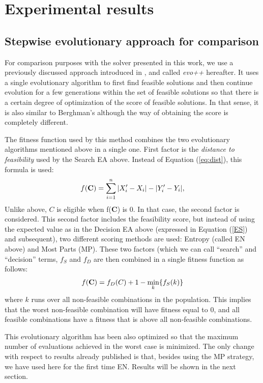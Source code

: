 \section{Experimental results}\label{Experiments}

\subsection{Stepwise evolutionary approach for comparison}
\label{ss:evo}

For comparison purposes with the solver presented in this work, we use a previously discussed approach introduced in \cite{Merelo12h}, and called {\em evo++} hereafter. It uses a single evolutionary algorithm to first find feasible
solutions and then continue evolution for a few generations within the
set of feasible solutions so that there is a certain degree of
optimization of the score of feasible solutions. In that sense, it is
also similar to Berghman's although the way of obtaining the score is
completely different.

The fitness function used by this method combines the two evolutionary algorithms
mentioned above in a single one. First factor is the {\em distance to
  feasibility} used by the Search EA above. Instead of Equation (\ref{eq:dist}),
this formula is used:
\begin{equation}
f({\bf C})=\sum_{i=1}^n |X'_i-X_i|-|Y'_i-Y_i|,
\label{eq:dist2}
\end{equation}
Unlike above, $C$ is eligible when f({\bf C}) is 0.
In that case, the second factor is considered. This second factor
includes the feasibility score, but instead of using the expected
value as in the Decision EA above (expressed in Equation (\ref{ES}) and
subsequent), two different scoring methods are used: Entropy (called
EN above) and Most Parts (MP). These two factors (which we can call
``search'' and ``decision'' terms, $f_S$ and $f_D$ are then combined
in a single fitness function as follows:
\[
f({\bf C}) = f_D(C) + 1-\min_k \{f_S(k)\}
\]
where $k$ runs over all non-feasible combinations in the
population. This implies that the worst non-feasible combination will
have fitness equal to 0, and all feasible combinations have a fitness
that is above all non-feasible combinations.

This evolutionary algorithm has been also optimized so that the
maximum number of evaluations achieved in the worst case is
minimized. The only change with respect to results already published
is that, besides using the MP strategy, we have used here for the
first time EN. Results will be shown in the next section.

